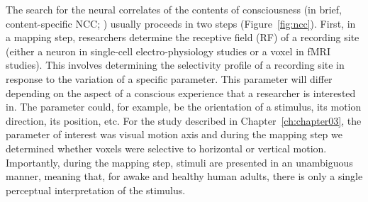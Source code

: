 The search for the neural correlates of the contents of consciousness (in brief, content-specific NCC; \cite{Koch2016}) usually proceeds in two steps (Figure~\ref{fig:ncc}). First, in a mapping step, researchers determine the receptive field (RF) of a recording site (either a neuron in single-cell electro-physiology studies or a voxel in fMRI studies). This involves determining the selectivity profile of a recording site in response to the variation of a specific parameter. This parameter will differ depending on the aspect of a conscious experience that a researcher is interested in. The parameter could, for example, be the orientation of a stimulus, its motion direction, its position, etc. For the study described in Chapter~\ref{ch:chapter03}, the parameter of interest was visual motion axis and during the mapping step we determined whether voxels were selective to horizontal or vertical motion. Importantly, during the mapping step, stimuli are presented in an unambiguous manner, meaning that, for awake and healthy human adults, there is only a single perceptual interpretation of the stimulus.

